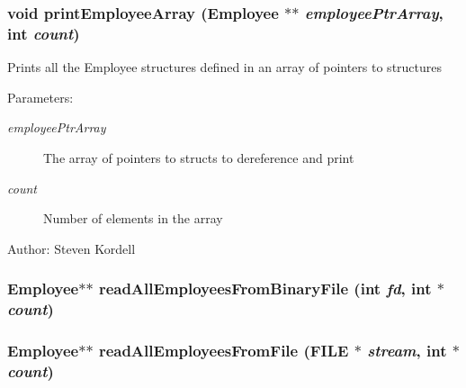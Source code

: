 \subsubsection{\setlength{\rightskip}{0pt plus 5cm}void print\-Employee\-Array (\bf{Employee} $\ast$$\ast$ {\em employee\-Ptr\-Array}, int {\em count})}\label{employeef_8c_3caa62038d3de5aaf99f615cd4c5b6e7}


Prints all the Employee structures defined in an array of pointers to structures \begin{Desc}
\item[Parameters:]
\begin{description}
\item[{\em employee\-Ptr\-Array}]The array of pointers to structs to dereference and print \item[{\em count}]Number of elements in the array \end{description}
\end{Desc}
\begin{Desc}
\item[Author:]Steven Kordell \end{Desc}
\subsubsection{\setlength{\rightskip}{0pt plus 5cm}\bf{Employee}$\ast$$\ast$ read\-All\-Employees\-From\-Binary\-File (int {\em fd}, int $\ast$ {\em count})}\label{employeef_8c_446e8ed3f3661f1856fca912048832b4}


\subsubsection{\setlength{\rightskip}{0pt plus 5cm}\bf{Employee}$\ast$$\ast$ read\-All\-Employees\-From\-File (FILE $\ast$ {\em stream}, int $\ast$ {\em count})}\label{employeef_8c_06cf2848ec681a5759cdc372d1dbc46c}



